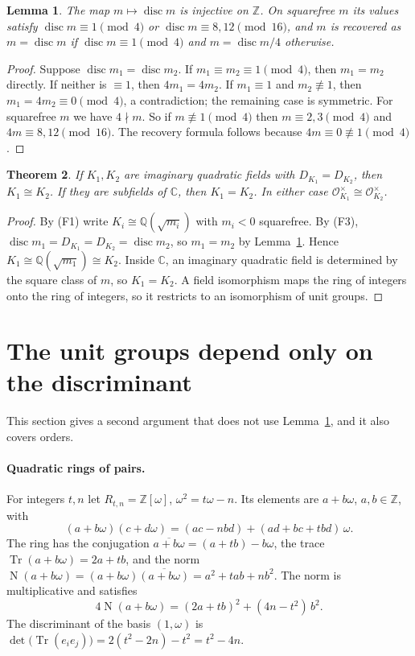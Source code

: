 \documentclass[11pt]{article}
\newtheorem{theorem}{Theorem}
\newtheorem{lemma}[theorem]{Lemma}
\theoremstyle{definition}
\theoremstyle{remark}
\newcommand{\Q}{\mathbb{Q}}
\newcommand{\Z}{\mathbb{Z}}
\newcommand{\C}{\mathbb{C}}
\newcommand{\OO}{\mathcal{O}}
\newcommand{\disc}{\operatorname{disc}}
\newcommand{\Tr}{\operatorname{Tr}}
\newcommand{\Nm}{\operatorname{N}}
\begin{document}
\begin{lemma}\label{lem:inj}
The map $m\mapsto\disc m$ is injective on $\Z$. On squarefree $m$ its values satisfy
$\disc m\equiv1\pmod 4$ or $\disc m\equiv 8,12\pmod{16}$, and $m$ is recovered as
$m=\disc m$ if $\disc m\equiv1\pmod4$ and $m=\disc m/4$ otherwise.
\end{lemma}
\begin{proof}
Suppose $\disc m_1=\disc m_2$. If $m_1\equiv m_2\equiv1\pmod4$, then $m_1=m_2$ directly. If
neither is $\equiv1$, then $4m_1=4m_2$. If $m_1\equiv1$ and $m_2\not\equiv1$, then
$m_1=4m_2\equiv0\pmod4$, a contradiction; the remaining case is symmetric. For squarefree $m$ we
have $4\nmid m$. So if $m\not\equiv1\pmod 4$ then $m\equiv2,3\pmod4$ and
$4m\equiv8,12\pmod{16}$. The recovery formula follows because $4m\equiv0\not\equiv1\pmod4$.
\end{proof}

\begin{theorem}\label{thm:same-field}
If $K_1,K_2$ are imaginary quadratic fields with $D_{K_1}=D_{K_2}$, then $K_1\cong K_2$. If they
are subfields of $\C$, then $K_1=K_2$. In either case
$\OO_{K_1}^\times\cong\OO_{K_2}^\times$.
\end{theorem}
\begin{proof}
By (F1) write $K_i\cong\Q(\sqrt{m_i})$ with $m_i<0$ squarefree. By (F3),
$\disc m_1=D_{K_1}=D_{K_2}=\disc m_2$, so $m_1=m_2$ by Lemma~\ref{lem:inj}. Hence
$K_1\cong\Q(\sqrt{m_1})\cong K_2$. Inside $\C$, an imaginary quadratic field is determined by the
square class of $m$, so $K_1=K_2$. A field isomorphism maps the ring of integers onto the ring of
integers, so it restricts to an isomorphism of unit groups.
\end{proof}

\section{The unit groups depend only on the discriminant}
This section gives a second argument that does not use Lemma~\ref{lem:inj}, and it also covers
orders.

\paragraph{Quadratic rings of pairs.}
For integers $t,n$ let $R_{t,n}=\Z[\omega]$, $\omega^2=t\omega-n$. Its elements are
$a+b\omega$, $a,b\in\Z$, with
\[
(a+b\omega)(c+d\omega)=(ac-nbd)+(ad+bc+tbd)\,\omega .
\]
The ring has the conjugation $\overline{a+b\omega}=(a+tb)-b\omega$, the trace
$\Tr(a+b\omega)=2a+tb$, and the norm $\Nm(a+b\omega)=(a+b\omega)\overline{(a+b\omega)}=a^2+tab+nb^2$.
The norm is multiplicative and satisfies
\begin{equation}\label{eq:4N}
4\Nm(a+b\omega)=(2a+tb)^2+(4n-t^2)\,b^2 .
\end{equation}
The discriminant of the basis $(1,\omega)$ is
$\det\big(\Tr(e_ie_j)\big)=2(t^2-2n)-t^2=t^2-4n$.
\end{document}
